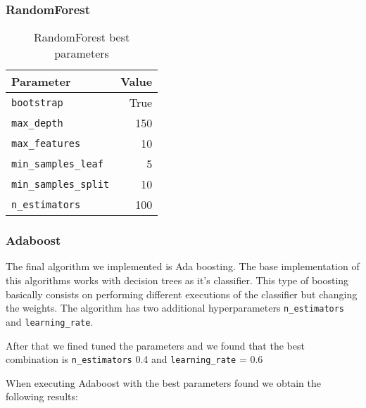 \begin{verbatim}
\end{verbatim}
 
\pagebreak
\subsubsection{RandomForest}

\begin{table}[H]
\centering
\caption{RandomForest best parameters}
\begin{tabular}{lr}
\toprule
Parameter & Value \\
\midrule
\texttt{bootstrap} & True \\
\texttt{max\_depth} & 150 \\
\texttt{max\_features} & 10 \\
\texttt{min\_samples\_leaf} & 5 \\
\texttt{min\_samples\_split} & 10 \\
\texttt{n\_estimators} & 100 \\
\bottomrule
\end{tabular}
\end{table}


\subsubsection{Adaboost}

The final algorithm we implemented is Ada boosting. The base implementation of this algorithms works with decision trees as it's classifier. This type of boosting basically consists on performing different executions of the classifier but changing the weights. The algorithm has two additional hyperparameters \texttt{n\_estimators} and \texttt{learning\_rate}.

After that we fined tuned the parameters and we found that the best combination is \texttt{n\_estimators} 0.4 and \texttt{learning\_rate} = 0.6

When executing Adaboost with the best parameters found we obtain the following results:



